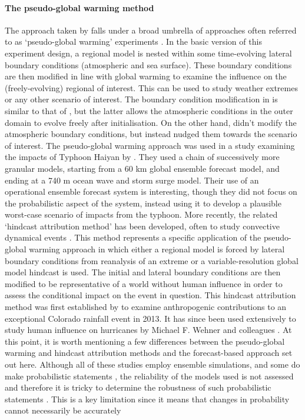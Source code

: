   \paragraph*{The pseudo-global warming method}

    The approach taken by \citeauthor{meredith_crucial_2015} falls under a broad umbrella of approaches often referred to as `pseudo-global warming' experiments \citep{schar_surrogate_1996}. In the basic version of this experiment design, a regional model is nested within some time-evolving lateral boundary conditions (atmospheric and sea surface). These boundary conditions are then modified in line with global warming to examine the influence on the (freely-evolving) regional of interest. This can be used to study weather extremes or any other scenario of interest. The boundary condition modification in \citeauthor{schar_surrogate_1996} is similar to that of \citeauthor[]{lackmann_hurricane_2015}, but the latter allows the atmospheric conditions in the outer domain to evolve freely after initialisation. On the other hand, \citeauthor[]{meredith_crucial_2015} didn't modify the atmospheric boundary conditions, but instead nudged them towards the scenario of interest. The pseudo-global warming approach was used in a study examining the impacts of Typhoon Haiyan by \citet{takayabu_climate_2015}. They used a chain of successively more granular models, starting from a 60 km global ensemble forecast model, and ending at a 740 m ocean wave and storm surge model. Their use of an operational ensemble forecast system is interesting, though they did not focus on the probabilistic aspect of the system, instead using it to develop a plausible worst-case scenario of impacts from the typhoon. More recently, the related `hindcast attribution method' has been developed, often to study convective dynamical events \citep{wehner_estimating_2019}. This method represents a specific application of the pseudo-global warming approach in which either a regional model is forced by lateral boundary conditions from reanalysis of an extreme or a variable-resolution global model hindcast is used. The initial and lateral boundary conditions are then modified to be representative of a world without human influence in order to assess the conditional impact on the event in question. This hindcast attribution method was first established by \citet{pall_diagnosing_2017} to examine anthropogenic contributions to an exceptional Colorado rainfall event in 2013. It has since been used extensively to study human influence on hurricanes by Michael F. Wehner and colleagues \citep{patricola_anthropogenic_2018,reed_forecasted_2020,reed_attribution_2022}. At this point, it is worth mentioning a few differences between the pseudo-global warming and hindcast attribution methods and the forecast-based approach set out here. Although all of these studies employ ensemble simulations, and some do make probabilistic statements \citep{pall_diagnosing_2017}, the reliability of the models used is not assessed and therefore it is tricky to determine the robustness of such probabilistic statements \citep{bellprat_towards_2019,weisheimer_reliability_2014}. This is a key limitation since it means that changes in probability cannot necessarily be accurately 